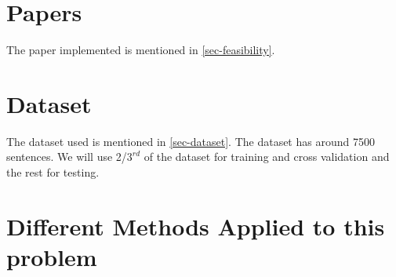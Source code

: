
\newpage
\section{Papers}
The paper implemented is mentioned in \ref{sec-feasibility}.

\section{Dataset}
The dataset used is mentioned in \ref{sec-dataset}. The dataset has around 7500 sentences. We will use 2/$3^{rd}$ of the dataset for training and cross validation and the rest for testing.

\section{Different Methods Applied to this problem}
